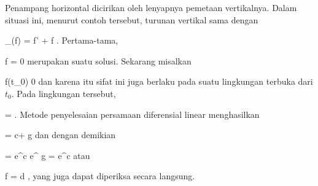 Penampang horizontal dicirikan oleh lenyapnya pemetaan vertikalnya. Dalam situasi ini, menurut
contoh tersebut,
turunan vertikal sama dengan

\mavergleichskettedisp
{\vergleichskette
{ \nabla_\partial (f)
}
{ =} { f' + f {  }
}
{ } {
}
{ } {
}
{ } {}
}
{}{}{.}
Pertama-tama,

\mavergleichskette
{\vergleichskette
{ f
}
{ = }{ 0
}
{  }{
}
{    }{
}
{   }{
}
}
{}{}{}
merupakan suatu solusi. Sekarang misalkan

\mavergleichskette
{\vergleichskette
{ f(t_0)
}
{ \neq }{ 0
}
{  }{
}
{    }{
}
{   }{
}
}
{}{}{}
dan karena itu sifat ini juga berlaku pada suatu lingkungan terbuka dari $t_0$. Pada lingkungan tersebut,

\mavergleichskettedisp
{\vergleichskette
{  {  }
}
{ =} { {  }
}
{ } {
}
{ } {
}
{ } {
}
}
{}{}{.}
Metode penyelesaian persamaan diferensial linear menghasilkan

\mavergleichskettedisp
{\vergleichskette
{   \ln  {}
}
{ =} { c+ {  }  \ln   g
}
{ } {
}
{ } {
}
{ } {
}
}
{}{}{}
dan dengan demikian

\mavergleichskettedisp
{\vergleichskette
{ 
}
{ =} { e^c e^{ {  }  \ln  g }
}
{ =} { e^c  
}
{ } {
}
{ } {
}
}
{}{}{}
atau

\mavergleichskettedisp
{\vergleichskette
{ f
}
{ =} { d 
}
{ } {
}
{ } {
}
{ } {
}
}
{}{}{}
 {} {,}
yang juga dapat diperiksa secara langsung.
